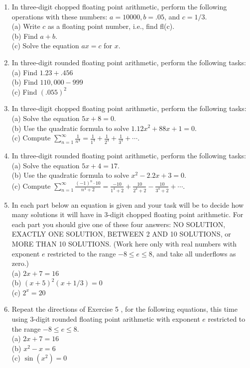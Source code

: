 \documentclass[../main.tex]{subfiles}
\begin{document}
\begin{enumerate}
\item In three-digit chopped floating point arithmetic, perform the following operations with these numbers: $a=10000, b=.05$, and $c=1 / 3$.\\
(a) Write $c$ as a floating point number, i.e., find fl(c).\\
(b) Find $a+b$.\\
(c) Solve the equation $a x=c$ for $x$.

\item In three-digit rounded floating point arithmetic, perform the following tasks:\\
(a) Find $1.23+.456$\\
(b) Find $110,000-999$\\
(c) Find $(.055)^{2}$

\item In three-digit chopped floating point arithmetic, perform the following tasks:\\
(a) Solve the equation $5 x+8=0$.\\
(b) Use the quadratic formula to solve $1.12 x^{2}+88 x+1=0$.\\
(c) Compute $\sum_{n=1}^{\infty} \frac{1}{n^{4}}=\frac{1}{1^{4}}+\frac{1}{2^{4}}+\frac{1}{3^{4}}+\cdots$.

\item In three-digit rounded floating point arithmetic, perform the following tasks:\\
(a) Solve the equation $5 x+4=17$.\\
(b) Use the quadratic formula to solve $x^{2}-2.2 x+3=0$.\\
(c) Compute $\sum_{n=1}^{\infty} \frac{(-1)^{n} \cdot 10}{n^{4}+2}=\frac{-10}{1^{4}+2}+\frac{10}{2^{4}+2}-\frac{10}{3^{4}+2}+\cdots$.

\item In each part below an equation is given and your task will be to decide how many solutions it will have in 3-digit chopped floating point arithmetic. For each part you should give one of these four answers: NO SOLUTION, EXACTLY ONE SOLUTION, BETWEEN 2 AND 10 SOLUTIONS, or MORE THAN 10 SOLUTIONS. (Work here only with real numbers with exponent $e$ restricted to the range $-8 \leq e \leq 8$, and take all underflows as zero.)\\
(a) $2 x+7=16$\\
(b) $(x+5)^{2}(x+1 / 3)=0$\\
(c) $2^{x}=20$

  \item Repeat the directions of Exercise 5 , for the following equations, this time using 3-digit rounded floating point arithmetic with exponent $e$ restricted to the range $-8 \leq e \leq 8$.\\
(a) $2 x+7=16$\\
(b) $x^{2}-x=6$\\
(c) $\sin \left(x^{2}\right)=0$


\end{enumerate}
\end{document}
